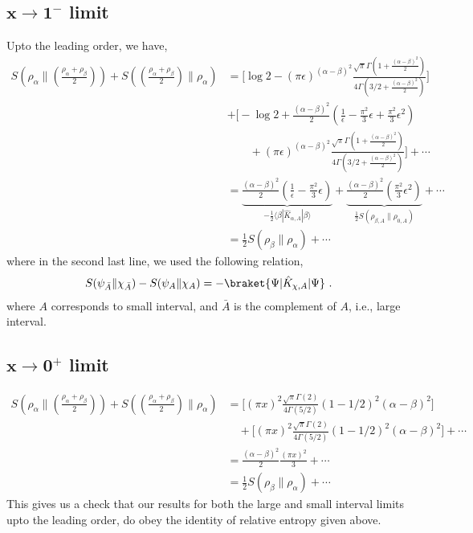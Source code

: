 \documentclass[11pt]{article}
\newcommand{\ep}{\epsilon}
\newcommand{\nn}{\nonumber}
\newcommand{\lb}{\left(}
\newcommand{\rb}{\right)}
\begin{document}
\subsection{\texorpdfstring{$\mathbf{x\to 1^-}$ limit}{x to 1 limit}}
Upto the leading order, we have,
\begin{align}
    S\lb \rho_\alpha \Big\| \lb\frac{\rho_\alpha + \rho_\beta}{2}\rb\rb + S\lb \lb\frac{\rho_\alpha + \rho_\beta}{2}\rb \Big\| \rho_\alpha\rb  &= \Bigg[\log 2 - (\pi \ep)^{(\alpha - \beta)^2} \frac{\sqrt{\pi }\Gamma\lb1+ \frac{(\alpha - \beta)^2}{2} \rb}{4\Gamma\lb3/2 + \frac{(\alpha - \beta)^2}{2}\rb } \Bigg] \nn \\
    &+ \Bigg[ -\log 2 + \frac{(\alpha-\beta)^2}{2}\lb \frac{1}{\ep} - \frac{\pi^2}{3}\ep+ \frac{\pi^2}{3}\ep^2\rb \nn\\ &\qquad + \lb\pi \ep\rb^{(\alpha-\beta)^2} \frac{\sqrt \pi \Gamma\lb1+\frac{(\alpha-\beta)^2}{2}\rb}{4\Gamma\lb3/2 + \frac{(\alpha-\beta)^2}{2}\rb}\Bigg] +\cdots \\
    &=  \underbrace{\frac{(\alpha-\beta)^2}{2}\lb\frac{1}{\ep} - \frac{\pi^2}{3}\ep\rb}_{-\frac{1}{2}\langle\beta|{\hat{K}_{\alpha,A}}|\beta\rangle} +  \underbrace{\frac{(\alpha-\beta)^2}{2} \lb   \frac{\pi^2}{3}\ep^2\rb}_{\frac{1}{2}S(\rho_{\beta,A}\|\rho_{0,A})}+ \cdots \\
    &= \frac{1}{2} S(\rho_\beta \| \rho_\alpha) + \cdots
\end{align}
where in the second last line, we used the following relation,
\begin{align}
   S(\psi_{\bar{A}}\|\chi_{\bar{A}})-S(\psi_A\|\chi_A)= -\braket{\Psi|\hat{K}_{\chi,A}|\Psi}\ .
\end{align}
where $A$ corresponds to small interval, and $\bar{A}$ is the complement of $A$, i.e., large interval.

\subsection{\texorpdfstring{$\mathbf{x\to 0^+}$ limit}{x to 0 limit}}
\begin{align}
    S\lb \rho_\alpha \Big\| \lb\frac{\rho_\alpha + \rho_\beta}{2}\rb\rb + S\lb \lb\frac{\rho_\alpha + \rho_\beta}{2}\rb \Big\| \rho_\alpha\rb  &= \Bigg[(\pi x)^{2}\frac{\sqrt{\pi}\Gamma(2)}{4\Gamma(5/2)}(1-1/2)^2(\alpha-\beta)^{2}\Bigg] \nn\\&\quad + \Bigg[(\pi x)^{2}\frac{\sqrt{\pi}\Gamma(2)}{4\Gamma(5/2)}(1-1/2)^2(\alpha-\beta)^{2}\Bigg]+ \cdots \\
    &= \frac{(\alpha-\beta)^2}{2} \frac{(\pi x)^2}{3} +\cdots\\
    &= \frac{1}{2} S(\rho_\beta \| \rho_\alpha) + \cdots
\end{align}
This gives us a check that our results for both the large and small interval limits upto the leading order, do obey the identity of relative entropy given above. 
\end{document}
